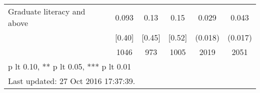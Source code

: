 \begin{table}[htbp]
\begin{tabular*}{0.9\hsize}{@{\hskip\tabcolsep\extracolsep\fill}l*{1}{ccccc}}
Graduate literacy and above     &    0.093&     0.13&     0.15&    0.029         &    0.043\sym{**} \\
                                &   [0.40]&   [0.45]&   [0.52]&  (0.018)         &  (0.017)         \\
                                &     1046&      973&     1005&     2019         &     2051         \\
\bottomrule
\multicolumn{6}{l}{\footnotesize * p lt 0.10, ** p lt 0.05, *** p lt 0.01}\\
\multicolumn{6}{l}{\footnotesize Last updated: 27 Oct 2016 17:37:39.}\\
\end{tabular*}
\end{table}
